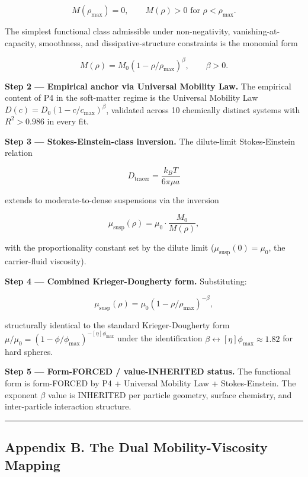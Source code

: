 \documentclass[
  11pt,a4paper]{article}
\begin{document}
\[M(\rho_\mathrm{max}) = 0, \qquad M(\rho) > 0 \text{ for } \rho < \rho_\mathrm{max}.\]

The simplest functional class admissible under non-negativity,
vanishing-at-capacity, smoothness, and dissipative-structure constraints
is the monomial form

\[M(\rho) = M_0 (1 - \rho/\rho_\mathrm{max})^\beta, \qquad \beta > 0.\]

\textbf{Step 2 --- Empirical anchor via Universal Mobility Law.} The
empirical content of P4 in the soft-matter regime is the Universal
Mobility Law \(D(c) = D_0(1 - c/c_\mathrm{max})^\beta\), validated
across 10 chemically distinct systems with \(R^2 > 0.986\) in every fit.

\textbf{Step 3 --- Stokes-Einstein-class inversion.} The dilute-limit
Stokes-Einstein relation

\[D_\mathrm{tracer} = \frac{k_B T}{6\pi \mu a}\]

extends to moderate-to-dense suspensions via the inversion

\[\mu_\mathrm{susp}(\rho) = \mu_0 \cdot \frac{M_0}{M(\rho)},\]

with the proportionality constant set by the dilute limit
(\(\mu_\mathrm{susp}(0) = \mu_0\), the carrier-fluid viscosity).

\textbf{Step 4 --- Combined Krieger-Dougherty form.} Substituting:

\[\mu_\mathrm{susp}(\rho) = \mu_0 (1 - \rho/\rho_\mathrm{max})^{-\beta},\]

structurally identical to the standard Krieger-Dougherty form
\(\mu/\mu_0 = (1 - \phi/\phi_\mathrm{max})^{-[\eta]\phi_\mathrm{max}}\)
under the identification
\(\beta \leftrightarrow [\eta]\phi_\mathrm{max} \approx 1.82\) for hard
spheres.

\textbf{Step 5 --- Form-FORCED / value-INHERITED status.} The functional
form is form-FORCED by P4 + Universal Mobility Law + Stokes-Einstein.
The exponent \(\beta\) value is INHERITED per particle geometry, surface
chemistry, and inter-particle interaction structure.

\begin{center}\rule{0.5\linewidth}{0.5pt}\end{center}

\subsection{Appendix B. The Dual Mobility-Viscosity
Mapping}\label{appendix-b.-the-dual-mobility-viscosity-mapping}
\end{document}
